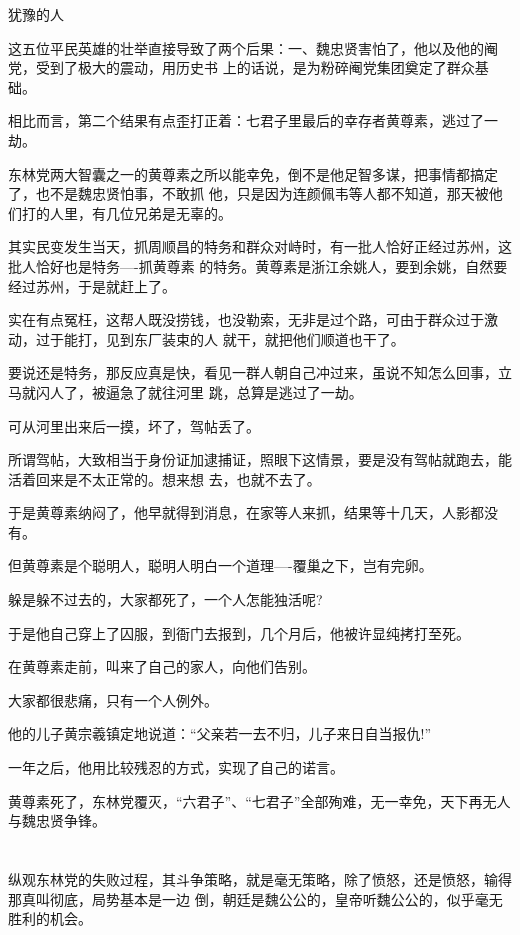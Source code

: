 \documentclass[11pt,a4paper,onecolumn]{article}
\begin{document}
犹豫的人

这五位平民英雄的壮举直接导致了两个后果：一、魏忠贤害怕了，他以及他的阉党，受到了极大的震动，用历史书
上的话说，是为粉碎阉党集团奠定了群众基础。

相比而言，第二个结果有点歪打正着：七君子里最后的幸存者黄尊素，逃过了一劫。

东林党两大智囊之一的黄尊素之所以能幸免，倒不是他足智多谋，把事情都搞定了，也不是魏忠贤怕事，不敢抓
他，只是因为连颜佩韦等人都不知道，那天被他们打的人里，有几位兄弟是无辜的。

其实民变发生当天，抓周顺昌的特务和群众对峙时，有一批人恰好正经过苏州，这批人恰好也是特务----抓黄尊素
的特务。黄尊素是浙江余姚人，要到余姚，自然要经过苏州，于是就赶上了。

实在有点冤枉，这帮人既没捞钱，也没勒索，无非是过个路，可由于群众过于激动，过于能打，见到东厂装束的人
就干，就把他们顺道也干了。

要说还是特务，那反应真是快，看见一群人朝自己冲过来，虽说不知怎么回事，立马就闪人了，被逼急了就往河里
跳，总算是逃过了一劫。

可从河里出来后一摸，坏了，驾帖丢了。

所谓驾帖，大致相当于身份证加逮捕证，照眼下这情景，要是没有驾帖就跑去，能活着回来是不太正常的。想来想
去，也就不去了。

于是黄尊素纳闷了，他早就得到消息，在家等人来抓，结果等十几天，人影都没有。

但黄尊素是个聪明人，聪明人明白一个道理----覆巢之下，岂有完卵。

躲是躲不过去的，大家都死了，一个人怎能独活呢?

于是他自己穿上了囚服，到衙门去报到，几个月后，他被许显纯拷打至死。

在黄尊素走前，叫来了自己的家人，向他们告别。

大家都很悲痛，只有一个人例外。

他的儿子黄宗羲镇定地说道：``父亲若一去不归，儿子来日自当报仇!''

一年之后，他用比较残忍的方式，实现了自己的诺言。

黄尊素死了，东林党覆灭，``六君子''、``七君子''全部殉难，无一幸免，天下再无人与魏忠贤争锋。

\section[\thesection]{}

纵观东林党的失败过程，其斗争策略，就是毫无策略，除了愤怒，还是愤怒，输得那真叫彻底，局势基本是一边
倒，朝廷是魏公公的，皇帝听魏公公的，似乎毫无胜利的机会。
\end{document}
